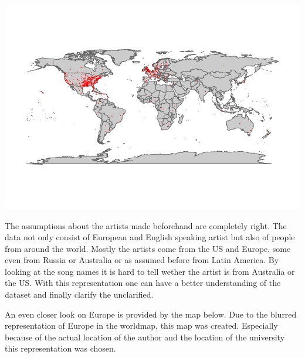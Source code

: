 \documentclass[]{article}
\newenvironment{Shaded}{\begin{snugshade}}{\end{snugshade}}
\newcommand{\KeywordTok}[1]{\textcolor[rgb]{0.13,0.29,0.53}{\textbf{#1}}}
\newcommand{\DataTypeTok}[1]{\textcolor[rgb]{0.13,0.29,0.53}{#1}}
\newcommand{\DecValTok}[1]{\textcolor[rgb]{0.00,0.00,0.81}{#1}}
\newcommand{\FloatTok}[1]{\textcolor[rgb]{0.00,0.00,0.81}{#1}}
\newcommand{\StringTok}[1]{\textcolor[rgb]{0.31,0.60,0.02}{#1}}
\newcommand{\CommentTok}[1]{\textcolor[rgb]{0.56,0.35,0.01}{\textit{#1}}}
\newcommand{\OtherTok}[1]{\textcolor[rgb]{0.56,0.35,0.01}{#1}}
\newcommand{\OperatorTok}[1]{\textcolor[rgb]{0.81,0.36,0.00}{\textbf{#1}}}
\newcommand{\NormalTok}[1]{#1}
\begin{document}
\includegraphics{Project2_files/figure-latex/worldmapArtist -1.pdf}

The assumptions about the artists made beforehand are completely right.
The data not only consist of European and English speaking artist but
also of people from around the world. Mostly the artists come from the
US and Europe, some even from Russia or Australia or as assumed before
from Latin America. By looking at the song names it is hard to tell
wether the artist is from Australia or the US. With this representation
one can have a better understanding of the dataset and finally clarify
the unclarified.

An even closer look on Europe is provided by the map below. Due to the
blurred representation of Europe in the worldmap, this map was created.
Especially because of the actual location of the author and the location
of the university this representation was chosen.

\begin{Shaded}
\end{Shaded}
\end{document}

